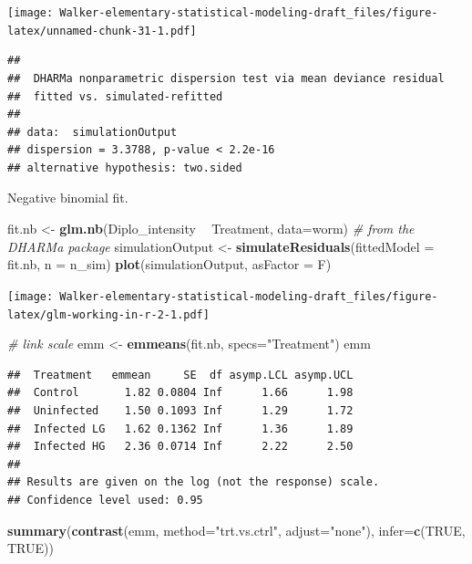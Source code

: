 \documentclass[]{book}
\newenvironment{Shaded}{\begin{snugshade}}{\end{snugshade}}
\newcommand{\KeywordTok}[1]{\textcolor[rgb]{0.13,0.29,0.53}{\textbf{#1}}}
\newcommand{\DataTypeTok}[1]{\textcolor[rgb]{0.13,0.29,0.53}{#1}}
\newcommand{\StringTok}[1]{\textcolor[rgb]{0.31,0.60,0.02}{#1}}
\newcommand{\CommentTok}[1]{\textcolor[rgb]{0.56,0.35,0.01}{\textit{#1}}}
\newcommand{\OtherTok}[1]{\textcolor[rgb]{0.56,0.35,0.01}{#1}}
\newcommand{\OperatorTok}[1]{\textcolor[rgb]{0.81,0.36,0.00}{\textbf{#1}}}
\newcommand{\NormalTok}[1]{#1}
\begin{document}
\texttt{[image: Walker-elementary-statistical-modeling-draft\_files/figure-latex/unnamed-chunk-31-1.pdf]}

\begin{verbatim}
## 
##  DHARMa nonparametric dispersion test via mean deviance residual
##  fitted vs. simulated-refitted
## 
## data:  simulationOutput
## dispersion = 3.3788, p-value < 2.2e-16
## alternative hypothesis: two.sided
\end{verbatim}

Negative binomial fit.

\begin{Shaded}
\begin{Highlighting}[]
\NormalTok{fit.nb <-}\StringTok{ }\KeywordTok{glm.nb}\NormalTok{(Diplo_intensity }\OperatorTok{~}\StringTok{ }\NormalTok{Treatment, }\DataTypeTok{data=}\NormalTok{worm)}
\CommentTok{# from the DHARMa package}
\NormalTok{  simulationOutput <-}\StringTok{ }\KeywordTok{simulateResiduals}\NormalTok{(}\DataTypeTok{fittedModel =}\NormalTok{ fit.nb, }\DataTypeTok{n =}\NormalTok{ n_sim)}
  \KeywordTok{plot}\NormalTok{(simulationOutput, }\DataTypeTok{asFactor =}\NormalTok{ F)}
\end{Highlighting}
\end{Shaded}

\texttt{[image: Walker-elementary-statistical-modeling-draft\_files/figure-latex/glm-working-in-r-2-1.pdf]}

\begin{Shaded}
\begin{Highlighting}[]
\CommentTok{# link scale}
\NormalTok{emm <-}\StringTok{ }\KeywordTok{emmeans}\NormalTok{(fit.nb, }\DataTypeTok{specs=}\StringTok{"Treatment"}\NormalTok{)}
\NormalTok{emm}
\end{Highlighting}
\end{Shaded}

\begin{verbatim}
##  Treatment   emmean     SE  df asymp.LCL asymp.UCL
##  Control       1.82 0.0804 Inf      1.66      1.98
##  Uninfected    1.50 0.1093 Inf      1.29      1.72
##  Infected LG   1.62 0.1362 Inf      1.36      1.89
##  Infected HG   2.36 0.0714 Inf      2.22      2.50
## 
## Results are given on the log (not the response) scale. 
## Confidence level used: 0.95
\end{verbatim}

\begin{Shaded}
\begin{Highlighting}[]
\KeywordTok{summary}\NormalTok{(}\KeywordTok{contrast}\NormalTok{(emm, }\DataTypeTok{method=}\StringTok{"trt.vs.ctrl"}\NormalTok{, }\DataTypeTok{adjust=}\StringTok{"none"}\NormalTok{), }\DataTypeTok{infer=}\KeywordTok{c}\NormalTok{(}\OtherTok{TRUE}\NormalTok{, }\OtherTok{TRUE}\NormalTok{))}
\end{Highlighting}
\end{Shaded}
\end{document}
